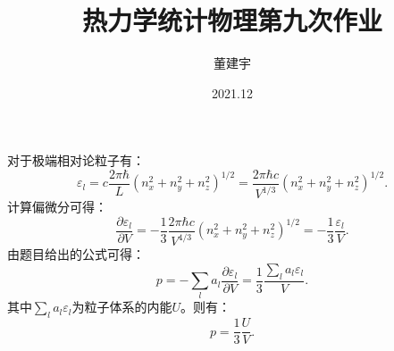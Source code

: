 \documentclass[a4paper,12pt]{article}
\title{热力学统计物理第九次作业}
\date{2021.12}
\author{董建宇}
\begin{document}
\maketitle 

\titleformat{\section}[hang]{\large}{\thesection}{0.8em}{}{}
\titleformat{\subsection}[hang]{\small}{\thesubsection}{0.8em}{}{}


\section{}
对于极端相对论粒子有：
\begin{equation}\nonumber
	\varepsilon_l = c\frac{2\pi\hbar}{L}\left( n_x^2+n_y^2+n_z^2 \right)^{1/2} = \frac{2\pi\hbar c}{V^{1/3}} \left( n_x^2+n_y^2+n_z^2 \right)^{1/2}.
\end{equation}
计算偏微分可得：
\begin{equation}\nonumber
	\frac{\partial \varepsilon_l}{\partial V} = -\frac{1}{3} \frac{2\pi\hbar c}{V^{4/3}} \left( n_x^2+n_y^2+n_z^2 \right)^{1/2} = -\frac{1}{3} \frac{\varepsilon_l}{V}.
\end{equation}
由题目给出的公式可得：
\begin{equation}\nonumber
	p = -\sum_l a_l \frac{\partial \varepsilon_l}{\partial V} = \frac{1}{3} \frac{\sum_l a_l\varepsilon_l}{V}.
\end{equation}
其中$\sum_l a_l\varepsilon_l$为粒子体系的内能$U$。则有：
\begin{equation}\nonumber
	p = \frac{1}{3}\frac{U}{V}.
\end{equation}
\end{document}
